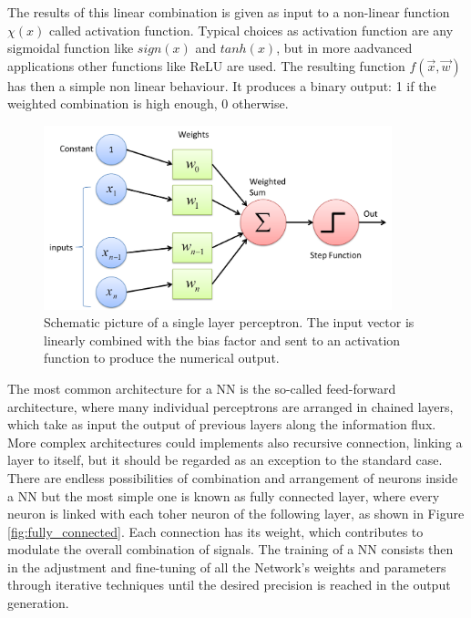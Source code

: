 The results of this linear combination is given as input to a non-linear function $\chi(x)$ called activation function. Typical choices as activation function are any sigmoidal function like $sign(x)$ and $tanh(x)$, but in more aadvanced applications other functions like ReLU \cite{1803.08375} are used. The resulting function $f(\vec{x},\vec{w})$ has then a simple non linear behaviour. It produces a binary output: 1 if the weighted combination is high enough, 0 otherwise.

\begin{figure}
    \centering
    \includegraphics[width = 0.9\textwidth]{images/perceptron}
    \caption{Schematic picture of a single layer perceptron. The input vector is linearly combined with the bias factor and sent to an activation function to produce the numerical output.}
    \label{fig:perceptron}
\end{figure}

The most common architecture for a NN is the so-called feed-forward architecture, where many individual perceptrons are arranged in chained layers, which take as input the output of previous layers along the information flux. More complex architectures could implements also recursive connection, linking a layer to itself, but it should be regarded as an exception to the standard case. There are endless possibilities of combination and arrangement of neurons inside a NN but the most simple one is known as fully connected layer, where every neuron is linked with each toher neuron of the following layer, as shown in Figure \ref{fig:fully_connected}. Each connection has its weight, which contributes to modulate the overall combination of signals. The training of a NN consists then in the adjustment and fine-tuning of all the Network's weights and parameters through iterative techniques until the desired precision is reached in the output generation.

